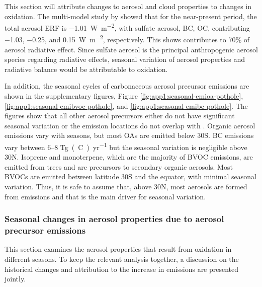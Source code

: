 This section will attribute changes to aerosol and cloud properties to changes in  oxidation. The multi-model study by \citet{thornhillEffectiveRadiativeForcing2021} showed that for the near-present period, the total aerosol ERF is \qty{-1.01}{W~m^{-2}}, with sulfate aerosol, BC, OC, contributing \num[]{-1.03}, \num[]{-0.25}, and \qty{0.15}{W~m^{-2}}, respectively. This shows  contributes to 70\% of aerosol radiative effect. Since sulfate aerosol is the principal anthropogenic aerosol species regarding radiative effects, seasonal variation of aerosol properties and radiative balance would be attributable to  oxidation. 

In addition, the seasonal cycles of carbonaceous aerosol precursor emissions are shown in the supplementary figures, Figure \ref{fig:app1:seasonal-emioa-pothole}, \ref{fig:app1:seasonal-emibvoc-pothole}, and \ref{fig:app1:seasonal-emibc-pothole}. The figures show that all other aerosol precursors either do not have significant seasonal variation or the emission locations do not overlap with . Organic aerosol emissions vary with seasons, but most OAs are emitted below 30\textdegree S. BC emissions vary between 6--8 \unit{Tg(C)~yr^{-1}} but the seasonal variation is negligible above 30\textdegree N.  Isoprene and monoterpene, which are the majority of BVOC emissions, are emitted from trees and are precursors to secondary organic aerosols. Most BVOCs are emitted between latitude 30\textdegree S and the equator, with minimal seasonal variation. Thus, it is safe to assume that, above 30\textdegree N, most aerosols are formed from  emissions and that  is the main driver for seasonal variation.


\subsubsection{Seasonal changes in aerosol properties due to aerosol precursor emissions}

This section examines the aerosol properties that result from oxidation in different seasons. To keep the relevant analysis together, a discussion on the historical changes and attribution to the increase in  emissions are presented jointly.



